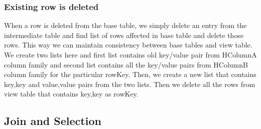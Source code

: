 \documentclass[11pt,a4paper,bibtotoc,idxtotoc,headsepline,footsepline,footexclude,BCOR12mm,DIV13]{scrbook}
\begin{document}
 

\subsubsection{Existing row is deleted}

When a row is deleted from the base table, we simply delete an entry from the intermediate table and find list of rows affected in base table and delete those rows. This way we can maintain consistency between base tables and view table. We create two lists here and first list contains old key/value pair from HColumnA column family and second list contains all the key/value pairs from HColumnB column family for the particular rowKey. Then, we create a new list that contains key,key and value,value pairs from the two lists. Then we delete all the rows from view table that contains key,key as rowKey.

\subsection{Join and Selection}
\label{subsec:joinandselection}
\end{document}
